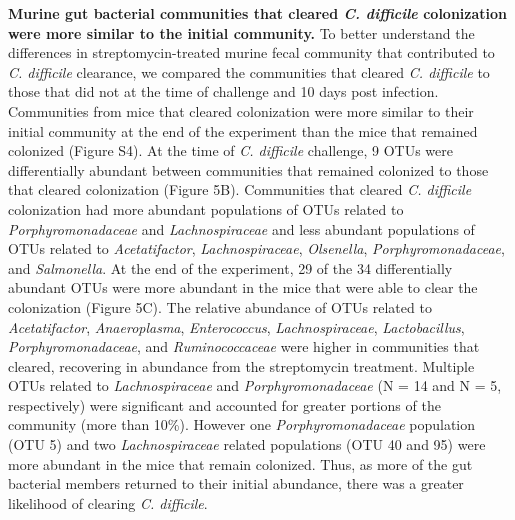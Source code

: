 \documentclass[
  12pt,
]{article}
\begin{document}
\textbf{Murine gut bacterial communities that cleared \emph{C.
difficile} colonization were more similar to the initial community.} To
better understand the differences in streptomycin-treated murine fecal
community that contributed to \emph{C. difficile} clearance, we compared
the communities that cleared \emph{C. difficile} to those that did not
at the time of challenge and 10 days post infection. Communities from
mice that cleared colonization were more similar to their initial
community at the end of the experiment than the mice that remained
colonized (Figure S4). At the time of \emph{C. difficile} challenge, 9
OTUs were differentially abundant between communities that remained
colonized to those that cleared colonization (Figure 5B). Communities
that cleared \emph{C. difficile} colonization had more abundant
populations of OTUs related to \emph{Porphyromonadaceae} and
\emph{Lachnospiraceae} and less abundant populations of OTUs related to
\emph{Acetatifactor}, \emph{Lachnospiraceae}, \emph{Olsenella},
\emph{Porphyromonadaceae}, and \emph{Salmonella}. At the end of the
experiment, 29 of the 34 differentially abundant OTUs were more abundant
in the mice that were able to clear the colonization (Figure 5C). The
relative abundance of OTUs related to \emph{Acetatifactor},
\emph{Anaeroplasma}, \emph{Enterococcus}, \emph{Lachnospiraceae},
\emph{Lactobacillus}, \emph{Porphyromonadaceae}, and
\emph{Ruminococcaceae} were higher in communities that cleared,
recovering in abundance from the streptomycin treatment. Multiple OTUs
related to \emph{Lachnospiraceae} and \emph{Porphyromonadaceae} (N = 14
and N = 5, respectively) were significant and accounted for greater
portions of the community (more than 10\%). However one
\emph{Porphyromonadaceae} population (OTU 5) and two
\emph{Lachnospiraceae} related populations (OTU 40 and 95) were more
abundant in the mice that remain colonized. Thus, as more of the gut
bacterial members returned to their initial abundance, there was a
greater likelihood of clearing \emph{C. difficile}.
\end{document}
